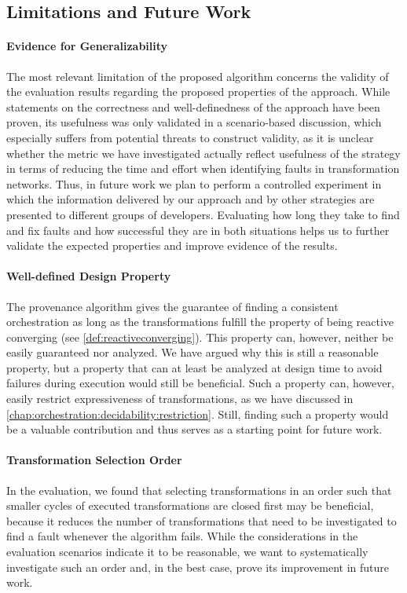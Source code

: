 \subsection{Limitations and Future Work}
\label{chap:correctness_evaluation:orchestration:limitations}

\paragraph{Evidence for Generalizability}
The most relevant limitation of the proposed algorithm concerns the validity of the evaluation results regarding the proposed properties of the approach.
While statements on the correctness and well-definedness of the approach have been proven, its usefulness was only validated in a scenario-based discussion, which especially suffers from potential threats to construct validity, as it is unclear whether the metric we have investigated actually reflect usefulness of the strategy in terms of reducing the time and effort when identifying faults in transformation networks.
Thus, in future work we plan to perform a controlled experiment in which the information delivered by our approach and by other strategies are presented to different groups of developers.
Evaluating how long they take to find and fix faults and how successful they are in both situations helps us to further validate the expected properties and improve evidence of the results.

\paragraph{Well-defined Design Property}
The provenance algorithm gives the guarantee of finding a consistent orchestration as long as the transformations fulfill the property of being reactive converging (see \autoref{def:reactiveconverging}).
This property can, however, neither be easily guaranteed nor analyzed.
We have argued why this is still a reasonable property, but a property that can at least be analyzed at design time to avoid failures during execution would still be beneficial.
Such a property can, however, easily restrict expressiveness of transformations, as we have discussed in \autoref{chap:orchestration:decidability:restriction}.
Still, finding such a property would be a valuable contribution and thus serves as a starting point for future work.

\paragraph{Transformation Selection Order}
In the evaluation, we found that selecting transformations in an order such that smaller cycles of executed transformations are closed first may be beneficial, because it reduces the number of transformations that need to be investigated to find a fault whenever the algorithm fails.
While the considerations in the evaluation scenarios indicate it to be reasonable, we want to systematically investigate such an order and, in the best case, prove its improvement in future work.


